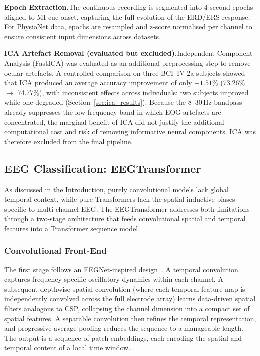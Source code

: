 \documentclass[12pt, a4paper]{article}
\begin{document}
\textbf{Epoch Extraction.}\quad The continuous recording is segmented into 4-second epochs aligned to MI cue onset, capturing the full evolution of the ERD/ERS response. For PhysioNet data, epochs are resampled and z-score normalised per channel to ensure consistent input dimensions across datasets.

\textbf{ICA Artefact Removal (evaluated but excluded).}\quad Independent Component Analysis (FastICA) was evaluated as an additional preprocessing step to remove ocular artefacts. A controlled comparison on three BCI~IV-2a subjects showed that ICA produced an average accuracy improvement of only $+1.51\%$ (73.26\% $\to$ 74.77\%), with inconsistent effects across individuals: two subjects improved while one degraded (Section~\ref{sec:ica_results}). Because the 8--30\,Hz bandpass already suppresses the low-frequency band in which EOG artefacts are concentrated, the marginal benefit of ICA did not justify the additional computational cost and risk of removing informative neural components. ICA was therefore excluded from the final pipeline.

\subsection{EEG Classification: EEGTransformer}

As discussed in the Introduction, purely convolutional models lack global temporal context, while pure Transformers lack the spatial inductive biases specific to multi-channel EEG. The EEGTransformer addresses both limitations through a two-stage architecture that feeds convolutional spatial and temporal features into a Transformer sequence model.

\subsubsection{Convolutional Front-End}

The first stage follows an EEGNet-inspired design~\cite{lawhern2018eegnet}. A temporal convolution captures frequency-specific oscillatory dynamics within each channel. A subsequent depthwise spatial convolution (where each temporal feature map is independently convolved across the full electrode array) learns data-driven spatial filters analogous to CSP, collapsing the channel dimension into a compact set of spatial features. A separable convolution then refines the temporal representation, and progressive average pooling reduces the sequence to a manageable length. The output is a sequence of patch embeddings, each encoding the spatial and temporal content of a local time window.
\end{document}
